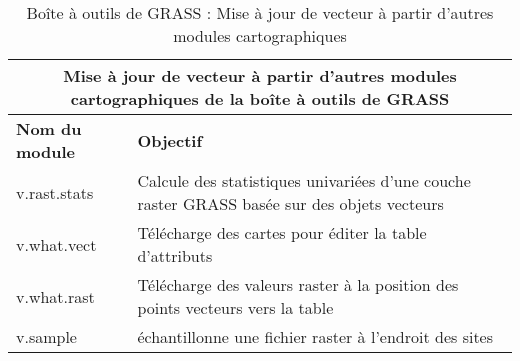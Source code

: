 \begin{table}[H]
\centering
 \begin{tabular}{|p{4cm}|p{10cm}|}
  \hline \multicolumn{2}{|c|}{\textbf{Mise à jour de vecteur à partir d'autres modules cartographiques de la boîte à outils de GRASS}} \\
  \hline \textbf{Nom du module} & \textbf{Objectif} \\
  \hline v.rast.stats & Calcule des statistiques univariées d'une couche raster GRASS basée sur des objets vecteurs\\
  \hline v.what.vect & Télécharge des cartes pour éditer la table d'attributs\\
  \hline v.what.rast & Télécharge des valeurs raster à la position des points vecteurs vers la table\\
  \hline v.sample & échantillonne une fichier raster à l'endroit des sites\\
\hline
\end{tabular}
\caption{Boîte à outils de GRASS : Mise à jour de vecteur à partir d'autres modules cartographiques}
\end{table}

\vspace{-0.5cm}


